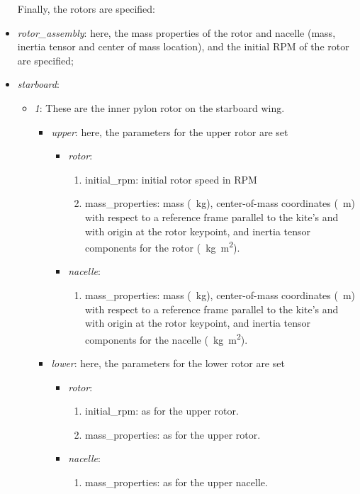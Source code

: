 \documentclass[report]{nrel}
\begin{document}
\begin{itemize}
Finally, the rotors are specified:
	\item \emph{rotor\_assembly}: here, the mass properties of the rotor and nacelle (mass, inertia tensor and center of mass location), and the initial RPM of the rotor are specified; 
	\item \emph{starboard}:
\begin{itemize}
	\item \emph{1}:	These are the inner pylon rotor on the starboard wing.
	\begin{itemize}
		\item \emph{upper}: here, the parameters for the upper rotor are set
		\begin{itemize}
			\item \emph{rotor}:
				\begin{enumerate}
					\item {initial\_rpm}: initial rotor speed in RPM
					\item {mass\_properties}: mass (\SI{}{\kg}), center-of-mass coordinates (\SI{}{\m}) with respect to a reference frame parallel to the kite's and with origin at the rotor keypoint, and inertia tensor components for the rotor (\SI{}{\kg\m\squared}). 
				\end{enumerate}
			\item \emph{nacelle}:
				\begin{enumerate}
				\item {mass\_properties}:  mass (\SI{}{\kg}), center-of-mass coordinates (\SI{}{\m}) with respect to a reference frame parallel to the kite's and with origin at the rotor keypoint, and inertia tensor components for the nacelle (\SI{}{\kg\m\squared}).  
				\end{enumerate}
 	\end{itemize}
		\item \emph{lower}: here, the parameters for the lower rotor are set
			\begin{itemize}
				\item \emph{rotor}:
				\begin{enumerate}
					\item {initial\_rpm}: as for the upper rotor.
					\item {mass\_properties}: as for the upper rotor. 
				\end{enumerate}
				\item \emph{nacelle}:
				\begin{enumerate}
					\item {mass\_properties}:  as for the upper nacelle.  

\end{enumerate}
\end{itemize}
\end{itemize}
\end{itemize}
\end{itemize}
\end{document}
